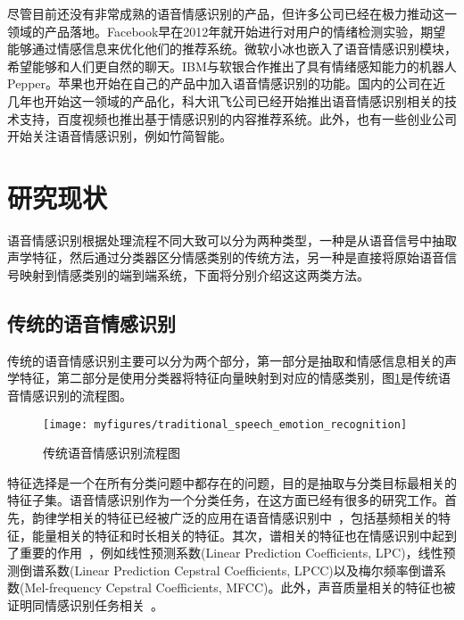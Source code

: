 尽管目前还没有非常成熟的语音情感识别的产品，但许多公司已经在极力推动这一领域的产品落地。Facebook早在2012年就开始进行对用户的情绪检测实验，期望能够通过情感信息来优化他们的推荐系统。微软小冰也嵌入了语音情感识别模块，希望能够和人们更自然的聊天。IBM与软银合作推出了具有情绪感知能力的机器人Pepper。苹果也开始在自己的产品中加入语音情感识别的功能。国内的公司在近几年也开始这一领域的产品化，科大讯飞公司已经开始推出语音情感识别相关的技术支持，百度视频也推出基于情感识别的内容推荐系统。此外，也有一些创业公司开始关注语音情感识别，例如竹简智能。

\section{研究现状}
\label{sec:status}
语音情感识别根据处理流程不同大致可以分为两种类型，一种是从语音信号中抽取声学特征，然后通过分类器区分情感类别的传统方法，另一种是直接将原始语音信号映射到情感类别的端到端系统，下面将分别介绍这这两类方法。

\subsection{传统的语音情感识别}
\label{ssec:classical_emo_rec}
传统的语音情感识别主要可以分为两个部分，第一部分是抽取和情感信息相关的声学特征，第二部分是使用分类器将特征向量映射到对应的情感类别，图\ref{fig:traditional_speech_emotion_recognition}是传统语音情感识别的流程图。

\begin{figure}[htb] %
    \vspace{-0.8cm}  %
    \setlength{\belowcaptionskip}{0cm}   %
    \centering
    \texttt{[image: myfigures/traditional\_speech\_emotion\_recognition]}
    \caption{传统语音情感识别流程图}
    \label{fig:traditional_speech_emotion_recognition}
\end{figure}

特征选择是一个在所有分类问题中都存在的问题，目的是抽取与分类目标最相关的特征子集。语音情感识别作为一个分类任务，在这方面已经有很多的研究工作。首先，韵律学相关的特征已经被广泛的应用在语音情感识别中~\cite{Cowie2002Emotion, Lee2005Toward, Murray1993Toward}，包括基频相关的特征，能量相关的特征和时长相关的特征。其次，谱相关的特征也在情感识别中起到了重要的作用~\cite{Atal1974Effectiveness, Banse1996Acoustic, Bou2000A, Hernando1997Linear, Kaiser1962Communication, Rabiner1999Fundamentals}，例如线性预测系数(Linear Prediction Coefficients, LPC)，线性预测倒谱系数(Linear Prediction Cepstral Coefficients, LPCC)以及梅尔频率倒谱系数(Mel-frequency Cepstral Coefficients, MFCC)。此外，声音质量相关的特征也被证明同情感识别任务相关~\cite{Cowie2002Emotion, Davitz1964The}。


